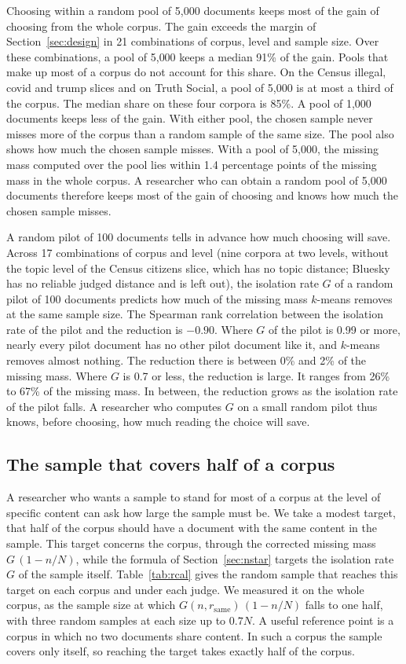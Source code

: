 Choosing within a random pool of 5{,}000 documents keeps most of the gain of choosing from the whole corpus. The gain exceeds the margin of Section~\ref{sec:design} in 21 combinations of corpus, level and sample size. Over these combinations, a pool of 5{,}000 keeps a median 91\% of the gain. Pools that make up most of a corpus do not account for this share. On the Census illegal, covid and trump slices and on Truth Social, a pool of 5{,}000 is at most a third of the corpus. The median share on these four corpora is 85\%. A pool of 1{,}000 documents keeps less of the gain. With either pool, the chosen sample never misses more of the corpus than a random sample of the same size. The pool also shows how much the chosen sample misses. With a pool of 5{,}000, the missing mass computed over the pool lies within 1.4 percentage points of the missing mass in the whole corpus. A researcher who can obtain a random pool of 5{,}000 documents therefore keeps most of the gain of choosing and knows how much the chosen sample misses.

A random pilot of 100 documents tells in advance how much choosing will save. Across 17 combinations of corpus and level (nine corpora at two levels, without the topic level of the Census citizens slice, which has no topic distance; Bluesky has no reliable judged distance and is left out), the isolation rate $G$ of a random pilot of 100 documents predicts how much of the missing mass $k$-means removes at the same sample size. The Spearman rank correlation between the isolation rate of the pilot and the reduction is $-0.90$. Where $G$ of the pilot is 0.99 or more, nearly every pilot document has no other pilot document like it, and $k$-means removes almost nothing. The reduction there is between 0\% and 2\% of the missing mass. Where $G$ is 0.7 or less, the reduction is large. It ranges from 26\% to 67\% of the missing mass. In between, the reduction grows as the isolation rate of the pilot falls. A researcher who computes $G$ on a small random pilot thus knows, before choosing, how much reading the choice will save.

\subsection{The sample that covers half of a corpus}
\label{sec:feasible}

A researcher who wants a sample to stand for most of a corpus at the level of specific content can ask how large the sample must be. We take a modest target, that half of the corpus should have a document with the same content in the sample. This target concerns the corpus, through the corrected missing mass $G\,(1 - n/N)$, while the formula of Section~\ref{sec:nstar} targets the isolation rate $G$ of the sample itself. Table~\ref{tab:rcal} gives the random sample that reaches this target on each corpus and under each judge. We measured it on the whole corpus, as the sample size at which $G(n, r_{\mathrm{same}})\,(1 - n/N)$ falls to one half, with three random samples at each size up to $0.7N$. A useful reference point is a corpus in which no two documents share content. In such a corpus the sample covers only itself, so reaching the target takes exactly half of the corpus.

